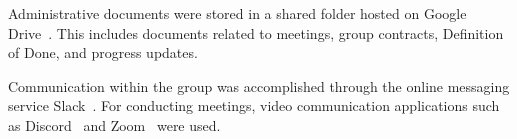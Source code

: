 Administrative documents were stored in a shared folder hosted on Google Drive~\cite{google_drive}.
This includes documents related to meetings, group contracts, Definition of Done, and progress updates.

Communication within the group was accomplished through the online messaging service Slack~\cite{slack}.
For conducting meetings, video communication applications such as Discord~\cite{discord} and Zoom~\cite{zoom} were used.

